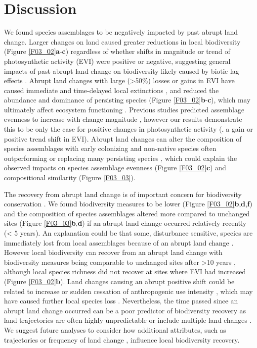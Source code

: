 \section{Discussion}
\label{C03_04}
We found species assemblages to be negatively impacted by past abrupt land change. Larger changes on land caused greater reductions in local biodiversity (Figure \ref{F03_02}\textbf{a}-\textbf{c}) regardless of whether shifts in magnitude or trend of photosynthetic activity (EVI) were positive or negative, suggesting general impacts of past abrupt land change on biodiversity \citep{Dornelas2010,Hautier2015} likely caused by biotic lag effects \citep{Hylander2013,Ogle2015,Jung2018}. Abrupt land changes with large (>50\%) losses or gains in EVI have caused immediate and time-delayed local extinctions \citep{Krauss2010,Halley2016,Wood2017}, and reduced the abundance and dominance of persisting species (Figure \ref{F03_02}\textbf{b}-\textbf{c}), which may ultimately affect ecosystem functioning \citep{Hautier2015,Isbell2015}. Previous studies predicted assemblage evenness to increase with change magnitude \citep{Svensson2012}, however our results demonstrate this to be only the case for positive changes in photosynthetic activity (\ie. a gain or positive trend shift in EVI). Abrupt land changes can alter the composition of species assemblages with early colonizing and non-native species often outperforming or replacing many persisting species \citep{Fraterrigo2006,Turner2010,Jauni2015}, which could explain the observed impacts on species assemblage evenness (Figure \ref{F03_02}\textbf{c}) and compositional similarity (Figure \ref{F03_03}).

The recovery from abrupt land change is of important concern for biodiversity conservation \citep{Chazdon2003}. We found biodiversity measures to be lower (Figure \ref{F03_02}\textbf{b},\textbf{d},\textbf{f}) and the composition of species assemblages altered more compared to unchanged sites (Figure \ref{F03_03}\textbf{b},\textbf{d}) if an abrupt land change occurred relatively recently (< 5 years). An explanation could be that some, disturbance sensitive, species are immediately lost from local assemblages because of an abrupt land change \citep{Devictor2008,Supp2014}. However local biodiversity can recover from an abrupt land change with biodiversity measures being comparable to unchanged sites after >10 years \citep{Martin2013,Moreno-Mateos2017}, although local species richness did not recover at sites where EVI had increased (Figure \ref{F03_02}\textbf{b}). Land changes causing an abrupt positive shift could be related to increase or sudden cessation of anthropogenic use intensity \citep{Eastman2013,Muller2014}, which may have caused further local species loss \citep{Tilman1994,Balmford1996,Hylander2013}. Nevertheless, the time passed since an abrupt land change occurred can be a poor predictor of biodiversity recovery as land trajectories are often highly unpredictable \citep{Norden2015} or include multiple land changes \citep{Watson2014}. We suggest future analyses to consider how additional attributes, such as trajectories or frequency of land change \citep{Watson2014}, influence local biodiversity recovery. 

